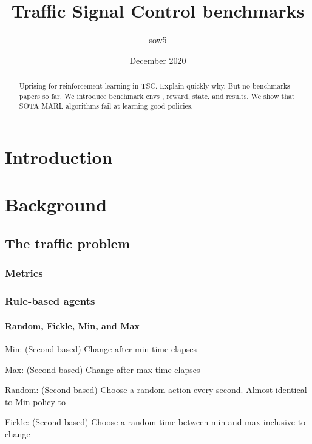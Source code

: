 \documentclass{article}
\title{Traffic Signal Control benchmarks}
\author{sow5}
\date{December 2020}
\begin{document}
\maketitle

\begin{abstract}
    Uprising for reinforcement learning in TSC. Explain quickly why. But no benchmarks papers so far. We introduce benchmark envs , reward, state, and results. We show that SOTA MARL algorithms fail at learning good policies.
\end{abstract}

\section{Introduction}



\section{Background}


    \subsection{The traffic problem}
    
    
        \subsubsection{Metrics}
        \subsubsection{Rule-based agents}
        
            \paragraph{Random, Fickle, Min, and Max}
            Min: (Second-based) Change after min time elapses
            
            Max: (Second-based) Change after max time elapses
            
            Random: (Second-based) Choose a random action every second. Almost identical to Min policy to 
            
            Fickle: (Second-based) Choose a random time between min and max inclusive to change
            
\end{document}
